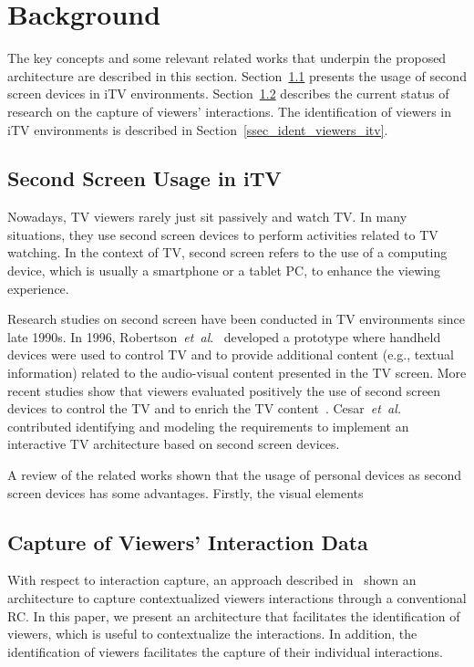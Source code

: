 \documentclass[journal]{IEEEtran}
\begin{document}
\section{Background}

The key concepts and some relevant related works that underpin the proposed architecture are described in this section. Section~\ref{ssec_ss_usage} presents the usage of second screen devices in iTV environments. Section~\ref{ssec_capture_viewers_int_data} describes the current status of research on the capture of viewers' interactions. The identification of viewers in iTV environments is described in Section~\ref{ssec_ident_viewers_itv}.

\subsection{Second Screen Usage in iTV}
\label{ssec_ss_usage}

Nowadays, TV viewers rarely just sit passively and watch TV. In many situations, they use second screen devices to perform activities related to TV watching. In the context of TV, second screen refers to the use of a computing device, which is usually a smartphone or a tablet PC, to enhance the viewing experience.

Research studies on second screen have been conducted in TV environments since late 1990s. In 1996, Robertson~\emph{et~al}.~\cite{Robertson1996} developed a prototype where handheld devices were used to control TV and to provide additional content (e.g., textual information) related to the audio-visual content presented in the TV screen. More recent studies show that viewers evaluated positively the use of second screen devices to control the TV and to enrich the TV content~\cite{Cesar2008,Cesar2011,Tsekleves2011}. Cesar~\emph{et~al.}~\cite{Cesar2009} contributed identifying and modeling the requirements to implement an interactive TV architecture based on second screen devices.

A review of the related works shown that the usage of personal devices as second screen devices has some advantages. Firstly, the visual elements 

\subsection{Capture of Viewers' Interaction Data}
\label{ssec_capture_viewers_int_data}

With respect to interaction capture, an approach described in~\cite{Teixeira2010} shown an architecture to capture contextualized viewers interactions through a conventional RC. In this paper, we present an architecture that facilitates the identification of viewers, which is useful to contextualize the interactions. In addition, the identification of viewers facilitates the capture of their individual interactions.
\end{document}
